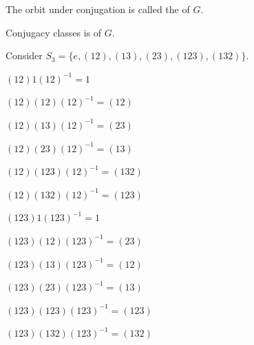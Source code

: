 \begin{definition}\label{def:conjugacy-class}
    The orbit under conjugation is called the  of $G$.
\end{definition}

\begin{remark}
    Conjugacy classes is  of $G$.
\end{remark}

\begin{example}
    Consider $S_3 = \{ e, (12), (13), (23), (123), (132) \}$.

    \begin{minipage}[t]{0.45\linewidth} \begin{listu}
        \item $(12) 1 (12)^{-1} = 1$
        \item $(12) (12) (12)^{-1} = (12)$
        \item $(12) (13) (12)^{-1} = (23)$
        \item $(12) (23) (12)^{-1} = (13)$
        \item $(12) (123) (12)^{-1} = (132)$
        \item $(12) (132) (12)^{-1} = (123)$
    \end{listu} \end{minipage}
    \begin{minipage}[t]{0.45\linewidth} \begin{listu}
        \item $(123) 1 (123)^{-1} = 1$
        \item $(123) (12) (123)^{-1} = (23)$
        \item $(123) (13) (123)^{-1} = (12)$
        \item $(123) (23) (123)^{-1} = (13)$
        \item $(123) (123) (123)^{-1} = (123)$
        \item $(123) (132) (123)^{-1} = (132)$
    \end{listu} \end{minipage}
\end{example}

